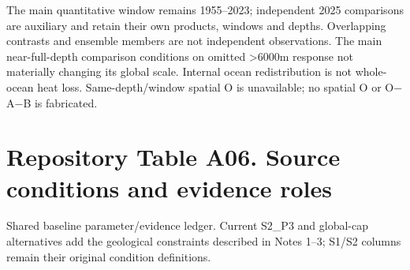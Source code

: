 \documentclass[11pt,a4paper]{article}
\begin{document}
The main quantitative window remains 1955--2023; independent 2025 comparisons are auxiliary and retain their own products, windows and depths. Overlapping contrasts and ensemble members are not independent observations. The main near-full-depth comparison conditions on omitted >6000m response not materially changing its global scale. Internal ocean redistribution is not whole-ocean heat loss. Same-depth/\allowbreak{}window spatial O is unavailable; no spatial O or O\ensuremath{-}A\ensuremath{-}B is fabricated.\par
\clearpage

\section*{Repository Table A06. Source conditions and evidence roles}
Shared baseline parameter/\allowbreak{}evidence ledger. Current S2\_\allowbreak{}P3 and global-cap alternatives add the geological constraints described in Notes 1--3; S1/\allowbreak{}S2 columns remain their original condition definitions.\par
\end{document}
